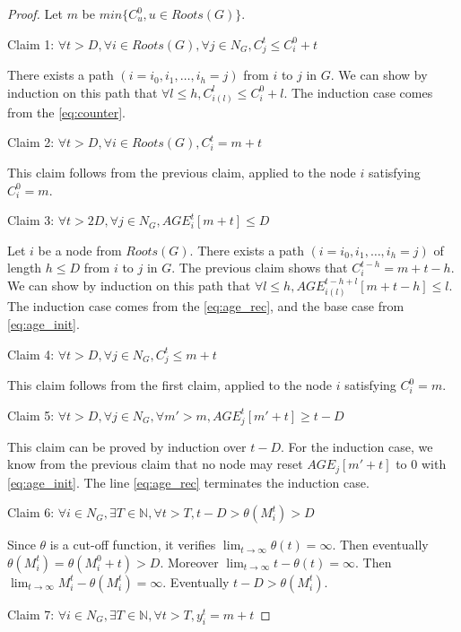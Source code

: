 \documentclass[11pt,letterpaper]{article}
\begin{document}
\begin{proof}
	Let $m$ be $min\{C_u^0, u \in Roots(G)\}$.

	\noindent Claim 1:
	$\forall t > D, \forall i \in Roots(G), \forall j \in N_G, C_j^t \leq C_i^0+t$

	There exists a path $(i = i_0, i_1, \dots, i_h = j)$ from $i$ to $j$ in $G$.
	We can show by induction on this path that $\forall l \leq h, C_{i(l)}^l \leq C_i^0+l$.
	The induction case comes from the \eqref{eq:counter}.

	\noindent Claim 2:
	$\forall t > D, \forall i \in Roots(G), C_i^t = m+t$

	This claim follows from the previous claim, applied to the node $i$ satisfying $C_i^0 = m$.

	\noindent Claim 3:
	$\forall t > 2D, \forall j \in N_G, AGE^t_i[m+t] \leq D$

	Let $i$ be a node from $Roots(G)$.
	There exists a path $(i = i_0, i_1, \dots, i_h = j)$ of length $h \leq D$ from $i$ to $j$ in $G$.
	The previous claim shows that $C_i^{t-h} = m+t-h$.
	We can show by induction on this path that $\forall l \leq h, AGE_{i(l)}^{t-h+l}[m+t-h] \leq l$.
	The induction case comes from the \eqref{eq:age_rec}, and the base case from \eqref{eq:age_init}.

	\noindent Claim 4:
	$\forall t > D, \forall j \in N_G, C_j^t \leq m+t$

	This claim follows from the first claim, applied to the node $i$ satisfying $C_i^0 = m$.

	\noindent Claim 5:
	$\forall t > D, \forall j \in N_G, \forall m' > m, AGE_j^t[m'+t] \geq t-D$

	This claim can be proved by induction over $t-D$.
	For the induction case, we know from the previous claim that no node may reset $AGE_j[m'+t]$ to 0 with \eqref{eq:age_init}.
	The line \eqref{eq:age_rec} terminates the induction case.

	\noindent Claim 6:
	$\forall i \in N_G, \exists T \in \mathds{N}, \forall t > T, t-D > \theta(M_i^t) > D$

	Since $\theta$ is a cut-off function, it verifies $\lim_{t \rightarrow \infty} \theta(t) = \infty$.
	Then eventually $\theta(M_i^t) = \theta(M_i^0+t) > D$.
	Moreover $\lim_{t \rightarrow \infty} t-\theta(t) = \infty$.
	Then $\lim_{t \rightarrow \infty} M_i^t - \theta(M_i^t) = \infty$.
	Eventually $t-D > \theta(M_i^t)$.

	\noindent Claim 7:
	$\forall i \in N_G, \exists T \in \mathds{N}, \forall t > T, y_i^t = m+t$


\end{proof}
\end{document}
